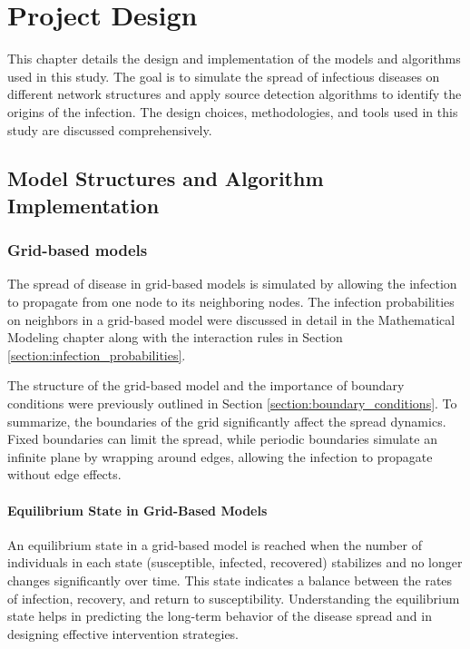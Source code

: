 \chapter{Project Design}

This chapter details the design and implementation of the models and algorithms used in this study. The goal is to simulate the spread of infectious diseases on different network structures and apply source detection algorithms to identify the origins of the infection. The design choices, methodologies, and tools used in this study are discussed comprehensively.

\section{Model Structures and Algorithm Implementation}

\subsection{Grid-based models}

The spread of disease in grid-based models is simulated by allowing the infection to propagate from one node to its neighboring nodes. The infection probabilities on neighbors in a grid-based model were discussed in detail in the Mathematical Modeling chapter along with the interaction rules in Section \ref{section:infection_probabilities}.

The structure of the grid-based model and the importance of boundary conditions were previously outlined in Section \ref{section:boundary_conditions}. To summarize, the boundaries of the grid significantly affect the spread dynamics. Fixed boundaries can limit the spread, while periodic boundaries simulate an infinite plane by wrapping around edges, allowing the infection to propagate without edge effects.

\subsubsection{Equilibrium State in Grid-Based Models}
An equilibrium state in a grid-based model is reached when the number of individuals in each state (susceptible, infected, recovered) stabilizes and no longer changes significantly over time. This state indicates a balance between the rates of infection, recovery, and return to susceptibility. Understanding the equilibrium state helps in predicting the long-term behavior of the disease spread and in designing effective intervention strategies.

